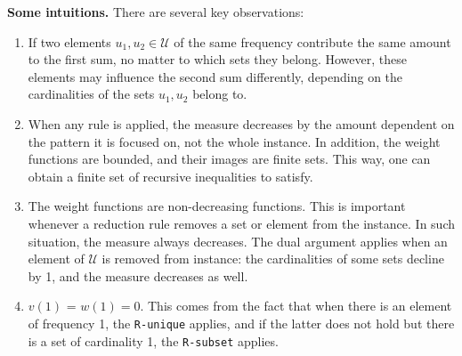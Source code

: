 \textbf{Some intuitions.} There are several key observations:
\begin{enumerate}
    \item If two elements $u_1, u_2\in \mathcal{U}$ of the same frequency contribute the same amount to the first sum, no matter to which sets they belong. However, these elements may influence the second sum differently, depending on the cardinalities of the sets $u_1, u_2$ belong to. 
    \item When any rule is applied, the measure decreases by the amount dependent on the pattern it is focused on, not the whole instance. In addition, the weight functions are bounded, and their images are finite sets. This way, one can obtain a finite set of recursive inequalities to satisfy. 
    \item The weight functions are non-decreasing functions. This is important whenever a reduction rule removes a set or element from the instance. In such situation, the measure always decreases. The dual argument applies when an element of $\mathcal{U}$ is removed from instance: the cardinalities of some sets decline by 1, and the measure decreases as well. 
    \item $v(1)$ = $w(1) = 0$. This comes from the fact that when there is an element of frequency 1, the \texttt{R-unique} applies, and if the latter does not hold but there is a set of cardinality 1, the \texttt{R-subset} applies.
\end{enumerate}

